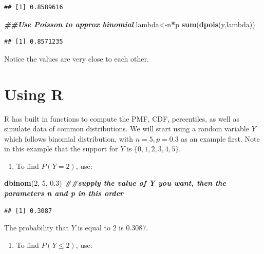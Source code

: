 \documentclass[
]{book}
\newenvironment{Shaded}{\begin{snugshade}}{\end{snugshade}}
\newcommand{\DecValTok}[1]{\textcolor[rgb]{0.00,0.00,0.81}{#1}}
\newcommand{\DocumentationTok}[1]{\textcolor[rgb]{0.56,0.35,0.01}{\textbf{\textit{#1}}}}
\newcommand{\FloatTok}[1]{\textcolor[rgb]{0.00,0.00,0.81}{#1}}
\newcommand{\FunctionTok}[1]{\textcolor[rgb]{0.13,0.29,0.53}{\textbf{#1}}}
\newcommand{\NormalTok}[1]{#1}
\newcommand{\OtherTok}[1]{\textcolor[rgb]{0.56,0.35,0.01}{#1}}
\newcommand{\SpecialCharTok}[1]{\textcolor[rgb]{0.81,0.36,0.00}{\textbf{#1}}}
\providecommand{\tightlist}{%
  \setlength{\itemsep}{0pt}\setlength{\parskip}{0pt}}
\begin{document}
\begin{verbatim}
## [1] 0.8589616
\end{verbatim}

\begin{Shaded}
\begin{Highlighting}[]
\DocumentationTok{\#\#Use Poisson to approx binomial}
\NormalTok{lambda}\OtherTok{\textless{}{-}}\NormalTok{n}\SpecialCharTok{*}\NormalTok{p}
\FunctionTok{sum}\NormalTok{(}\FunctionTok{dpois}\NormalTok{(y,lambda))}
\end{Highlighting}
\end{Shaded}

\begin{verbatim}
## [1] 0.8571235
\end{verbatim}

Notice the values are very close to each other.

\hypertarget{Rdis}{%
\section{Using R}\label{Rdis}}

R has built in functions to compute the PMF, CDF, percentiles, as well as simulate data of common distributions. We will start using a random variable \(Y\) which follows binomial distribution, with \(n=5, p = 0.3\) as an example first. Note in this example that the support for \(Y\) is \(\{0,1,2,3,4,5 \}\).

\begin{enumerate}
\def\labelenumi{\arabic{enumi}.}
\tightlist
\item
  To find \(P(Y=2)\), use:
\end{enumerate}

\begin{Shaded}
\begin{Highlighting}[]
\FunctionTok{dbinom}\NormalTok{(}\DecValTok{2}\NormalTok{, }\DecValTok{5}\NormalTok{, }\FloatTok{0.3}\NormalTok{) }\DocumentationTok{\#\#supply the value of Y you want, then the parameters n and p in this order}
\end{Highlighting}
\end{Shaded}

\begin{verbatim}
## [1] 0.3087
\end{verbatim}

The probability that \(Y\) is equal to 2 is 0.3087.

\begin{enumerate}
\def\labelenumi{\arabic{enumi}.}
\setcounter{enumi}{1}
\tightlist
\item
  To find \(P(Y \leq 2)\), use:
\end{enumerate}
\end{document}

